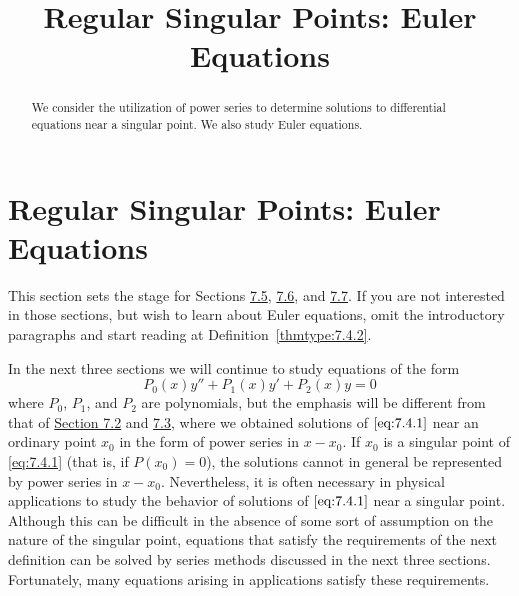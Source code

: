 \documentclass{ximera}
\title{Regular Singular Points:   Euler Equations}%
\begin{document}
\begin{abstract}
We consider the utilization of power series to determine solutions to differential equations near a singular point.  We also study Euler equations.
\end{abstract}

\maketitle

\section*{Regular Singular Points:   Euler Equations}

\begin{remark}This section sets the stage for Sections  \href{https://xerxes.ximera.org/differentialequations/main/frobeniusI/frobeniusI}{7.5},
\href{https://xerxes.ximera.org/differentialequations/main/frobeniusII/frobeniusII}{7.6},
and \href{https://xerxes.ximera.org/differentialequations/main/frobeniusIII/frobeniusIII}{7.7}. If you are not interested in those sections, but wish
to learn about Euler equations, omit the introductory paragraphs
and start reading at Definition~\ref{thmtype:7.4.2}.
\end{remark}

In the next three sections we will continue to study  equations of the form
\begin{equation}\label{eq:7.4.1}
P_0(x)y''+P_1(x)y'+P_2(x)y=0
\end{equation}
where $P_0$, $P_1$, and $P_2$ are polynomials, but the emphasis will
be different from that of \href{https://ximera.osu.edu/ode/main/seriesSolNearOrdinaryPtI/seriesSolNearOrdinaryPtI}{Section 7.2} and \href{https://ximera.osu.edu/ode/main/seriesSolNearOrdinaryPtII/seriesSolNearOrdinaryPtII}{7.3},
where we obtained solutions of $\eqref{eq:7.4.1}$ near an ordinary point $x_0$ in the
form of power series in $x-x_0$. If $x_0$ is a singular point of
\eqref{eq:7.4.1} (that is, if $P(x_0)=0$),  the solutions cannot in general be represented by power series in $x-x_0$. Nevertheless, it is
often necessary in physical applications to study the behavior of
solutions of $\eqref{eq:7.4.1}$ near a singular point. Although this can be difficult in the absence of some sort of assumption on the nature of
the singular point, equations that satisfy the requirements of the
next definition can be solved by series methods discussed in the
next three sections. Fortunately, many equations arising in applications satisfy these requirements.
\end{document}
